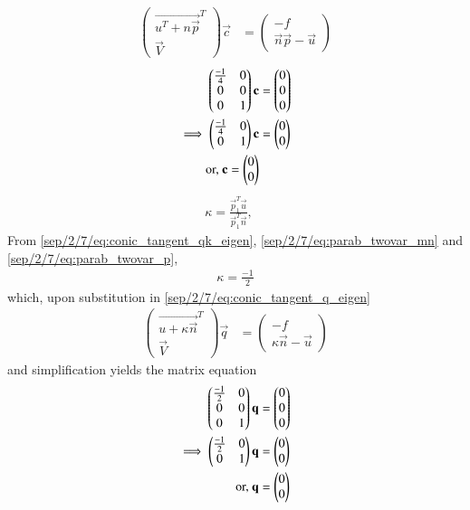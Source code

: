 \begin{align}
\label{sep/2/7/eq:vertex}
\begin{pmatrix}
\vec{u^T+n \vec{p}}^T \\ \vec{V}
\end{pmatrix}
\vec{c} &= 
\begin{pmatrix}
-f
\\
\vec{n}\vec{p}-\vec{u}
\end{pmatrix}
\end{align}
\begin{align}
\begin{pmatrix}\frac{-1}{4} & 0 \\ 0 & 0 \\ 0 & 1\end{pmatrix}\mathbf{c} &= \begin{pmatrix}0 \\ 0\\0\end{pmatrix} 
\\
\implies 
\begin{pmatrix}\frac{-1}{4} & 0 \\  0 & 1\end{pmatrix}\mathbf{c} &= \begin{pmatrix}0 \\ 0\end{pmatrix} 
\\
\text{or, } \mathbf{c} = \begin{pmatrix}0\\0\end{pmatrix}
\end{align}
\begin{align}
\label{sep/2/7/eq:conic_tangent_qk_eigen} \kappa = \frac{\vec{p}_1^T\vec{u}}{\vec{p}_1^T\vec{n}}, \quad 
\end{align}
From \eqref{sep/2/7/eq:conic_tangent_qk_eigen}, \eqref{sep/2/7/eq:parab_twovar_mn} and \eqref{sep/2/7/eq:parab_twovar_p},
\begin{align}
\kappa =\frac{-1}{2}
\end{align}
which, upon substitution in  \eqref{sep/2/7/eq:conic_tangent_q_eigen}
\begin{align}
\label{sep/2/7/eq:conic_tangent_q_eigen}
\begin{pmatrix}
\vec{u+\kappa \vec{n}}^T \\ \vec{V}
\end{pmatrix}
\vec{q} &= 
\begin{pmatrix}
-f
\\
\kappa\vec{n}-\vec{u}
\end{pmatrix}
\end{align}
and simplification yields the matrix equation
\begin{align}
\begin{pmatrix}\frac{-1}{2} & 0 \\0 & 0\\0&1\end{pmatrix}\mathbf{q} &= \begin{pmatrix}0\\0\\0\end{pmatrix}
\\
\implies \begin{pmatrix}\frac{-1}{2} & 0\\0&1\end{pmatrix}\mathbf{q} &= \begin{pmatrix}0\\0\end{pmatrix}
\\
\text{or, } \mathbf{q} &= \begin{pmatrix}0 \\0\end{pmatrix}
\end{align}
 
